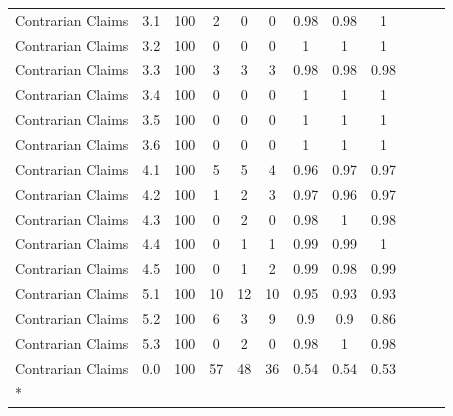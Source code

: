 \documentclass{article}
\begin{document}
\begin{longtable}{@{}llcccccccccc@{}}
Contrarian   Claims & 3.1           & 100 & 2  & 0  & 0  & 0.98 & 0.98 & 1    \\[1mm]
Contrarian   Claims & 3.2           & 100 & 0  & 0  & 0  & 1    & 1    & 1    \\[1mm]
Contrarian   Claims & 3.3           & 100 & 3  & 3  & 3  & 0.98 & 0.98 & 0.98 \\[1mm]
Contrarian   Claims & 3.4           & 100 & 0  & 0  & 0  & 1    & 1    & 1    \\[1mm]
Contrarian   Claims & 3.5           & 100 & 0  & 0  & 0  & 1    & 1    & 1    \\[1mm]
Contrarian   Claims & 3.6           & 100 & 0  & 0  & 0  & 1    & 1    & 1    \\[1mm]
Contrarian   Claims & 4.1           & 100 & 5  & 5  & 4  & 0.96 & 0.97 & 0.97 \\[1mm]
Contrarian   Claims & 4.2           & 100 & 1  & 2  & 3  & 0.97 & 0.96 & 0.97 \\[1mm]
Contrarian   Claims & 4.3           & 100 & 0  & 2  & 0  & 0.98 & 1    & 0.98 \\[1mm]
Contrarian   Claims & 4.4           & 100 & 0  & 1  & 1  & 0.99 & 0.99 & 1    \\[1mm]
Contrarian   Claims & 4.5           & 100 & 0  & 1  & 2  & 0.99 & 0.98 & 0.99 \\[1mm]
Contrarian   Claims & 5.1           & 100 & 10 & 12 & 10 & 0.95 & 0.93 & 0.93 \\[1mm]
Contrarian   Claims & 5.2           & 100 & 6  & 3  & 9  & 0.9  & 0.9  & 0.86 \\[1mm]
Contrarian   Claims & 5.3           & 100 & 0  & 2  & 0  & 0.98 & 1    & 0.98 \\[1mm]
Contrarian   Claims & 0.0           & 100 & 57 & 48 & 36 & 0.54 & 0.54 & 0.53 \\* \bottomrule
\end{longtable}
\end{document}
